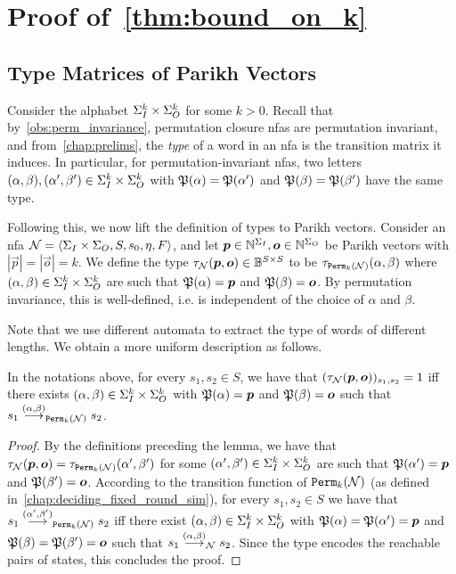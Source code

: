 \section{Proof of~\cref{thm:bound_on_k}}
\label{sec:proof_of_bound}
\subsection*{Type Matrices of Parikh Vectors}
Consider the alphabet $\Sigma_{I}^k\times \Sigma_{O}^k$ for some $k>0$.
Recall that by~\cref{obs:perm_invariance}, permutation closure \glspl{nfa} are permutation invariant, and from~\cref{chap:prelims}, the \emph{type} of a word in an \gls{nfa} is the transition matrix it induces.
In particular, for permutation-invariant \glspl{nfa}, two letters $(\alpha,\beta),(\alpha',\beta')\in \Sigma_{I}^k\times \Sigma_{O}^k$ with $\mathfrak{P}(\alpha)=\mathfrak{P}(\alpha')$ and $\mathfrak{P}(\beta)=\mathfrak{P}(\beta')$ have the same type.

Following this, we now lift the definition of types to Parikh vectors. Consider an \gls{nfa} $\mathcal{N}=\left< \Sigma_{I}\times \Sigma_{O},S,s_0,\eta,F\right>$, and let $\boldsymbol{p}\in \mathbb{N}^{\Sigma_{I}},\boldsymbol{o}\in \mathbb{N}^{\Sigma_{O}}$ be Parikh vectors with $|\vec{p}|=|\vec{o}|=k$. We define the type $\tau_{\mathcal{N}}(\boldsymbol{p},\boldsymbol{o})\in \mathbb{B}^{S\times S}$ to be $\tau_{{\mathtt{Perm}}_k(\mathcal{N})}(\alpha,\beta)$ where $(\alpha,\beta)\in \Sigma_{I}^k\times \Sigma_{O}^k$ are such that $\mathfrak{P}(\alpha)=\boldsymbol{p}$ and $\mathfrak{P}(\beta)=\boldsymbol{o}$. By permutation invariance, this is well-defined, i.e. is independent of the choice of $\alpha$ and $\beta$.

Note that we use different automata to extract the type of words of different lengths. We obtain a more uniform description as follows.
\begin{lemma}
\label{lem:type_of_parikh}
    In the notations above, for every $s_1,s_2\in S$, we have that $(\tau_{\mathcal{N}}(\boldsymbol{p},\boldsymbol{o}))_{s_1,s_2}=1$ iff there exists $(\alpha,\beta)\in \Sigma_{I}^k\times \Sigma_{O}^k$ with $\mathfrak{P}(\alpha)=\boldsymbol{p}$ and $\mathfrak{P}(\beta)=\boldsymbol{o}$ such that $s_1\stackrel{(\alpha,\beta)}{\longrightarrow}_{{\mathtt{Perm}}_k(\mathcal{N})}s_2$.
\end{lemma}
\begin{proof}
    By the definitions preceding the lemma, we have that $\tau_{\mathcal{N}}(\boldsymbol{p},\boldsymbol{o})=\tau_{{\mathtt{Perm}}_k(\mathcal{N})}(\alpha',\beta')$ for some $(\alpha',\beta')\in \Sigma_{I}^k\times \Sigma_{O}^k$ are such that $\mathfrak{P}(\alpha')=\boldsymbol{p}$ and $\mathfrak{P}(\beta')=\boldsymbol{o}$. According to the transition function of ${\mathtt{Perm}}_k(\mathcal{N})$ (as defined in~\cref{chap:deciding_fixed_round_sim}), for every $s_1,s_2\in S$ we have that $s_1\stackrel{(\alpha',\beta')}{\longrightarrow}_{{\mathtt{Perm}}_k(\mathcal{N})}s_2$ iff there exist $(\alpha,\beta)\in \Sigma_{I}^k\times \Sigma_{O}^k$ with $\mathfrak{P}(\alpha)=\mathfrak{P}(\alpha')=\boldsymbol{p}$ and $\mathfrak{P}(\beta)=\mathfrak{P}(\beta')=\boldsymbol{o}$ such that $s_1\stackrel{(\alpha,\beta)}{\longrightarrow}_{\mathcal{N}}s_2$. Since the type encodes the reachable pairs of states, this concludes the proof.
\end{proof}

